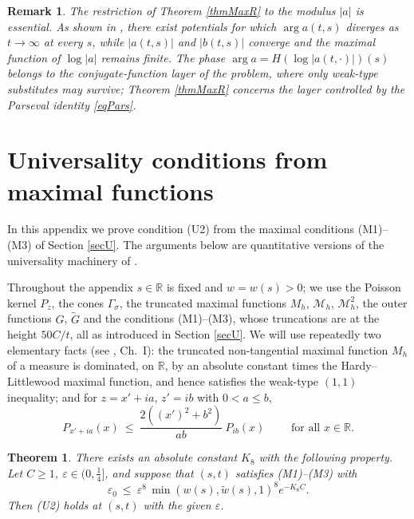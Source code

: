 \documentclass[11pt,twoside,reqno]{amsart}
\def\ti{\tilde}
\def\to{\rightarrow}
\def\R{{\mathbb R}}
\def\MM{{\mathcal M}}
\def\e{\varepsilon}
\def\G{\Gamma}
\def\s{\sigma}
\theoremstyle{plain}
\newtheorem{theorem}{Theorem}
\newtheorem{remark}{Remark}
\numberwithin{equation}{section}
\begin{document}
\begin{remark} The restriction of Theorem \ref{thmMaxR} to the modulus $|a|$ is essential. As shown in \cite{Den2}, there exist potentials for which $\arg a(t,s)$ diverges as $t\to\infty$ at every $s$, while $|a(t,s)|$ and $|b(t,s)|$ converge and the maximal function of $\log|a|$ remains finite. The phase $\arg a=H(\log|a(t,\cdot)|)(s)$ belongs to the conjugate-function layer of the problem, where only weak-type substitutes may survive; Theorem \ref{thmMaxR} concerns the layer controlled by the Parseval identity \eqref{eqPars}.
\end{remark}


\appendix

\section{Universality conditions from maximal functions}\label{secApp}

In this appendix we prove condition (U2) from the maximal conditions (M1)--(M3) of Section \ref{secU}. The arguments below are quantitative versions of the universality machinery of \cite{Scatter}.

Throughout the appendix $s\in\R$ is fixed and $w=w(s)>0$; we use the Poisson kernel $P_z$, the cones $\G_\s$, the truncated maximal functions $M_h$, $\MM_h$, $\MM^2_h$, the outer functions $G$, $\ti G$ and the conditions (M1)--(M3), whose truncations are at the height $50C/t$, all as introduced in Section \ref{secU}. We will use repeatedly two elementary facts (see \cite{G}, Ch.~I): the truncated non-tangential maximal function $M_h$ of a measure is dominated, on $\R$, by an absolute constant times the Hardy--Littlewood maximal function, and hence satisfies the weak-type $(1,1)$ inequality; and for $z=x'+ia$, $z'=ib$ with $0<a\leq b$,
\begin{equation}
P_{x'+ia}(x)\ \leq\ \frac{2\left((x')^2+b^2\right)}{ab}\ P_{ib}(x)\qquad\text{ for all }x\in\R .
\label{eqAker}
\end{equation}

\begin{theorem}\label{thmAppMain}
There exists an absolute constant $K_8$ with the following property. Let $C\geq1$, $\e\in(0,\tfrac14]$, and suppose that $(s,t)$ satisfies {\rm(M1)--(M3)} with
\begin{equation}
\e_0\ \leq\ \e^{8}\,\min\left(w(s),\ti w(s),1\right)^{8}e^{-K_8C}.
\label{eqAthr}
\end{equation}
Then {\rm(U2)} holds at $(s,t)$ with the given $\e$.
\end{theorem}
\end{document}
